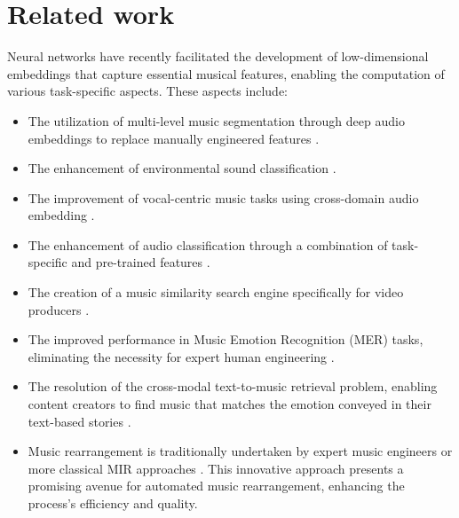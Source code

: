 \section{Related work}

Neural networks have recently facilitated the development of low-dimensional embeddings that capture essential musical features, enabling the computation of various task-specific aspects. These aspects include:

\begin{itemize}

\item The utilization of multi-level music segmentation through deep audio embeddings to replace manually engineered features \cite{SalamonDeepSegmentation}.

\item The enhancement of environmental sound classification \cite{Kim2020OneStrategies}.

\item The improvement of vocal-centric music tasks using cross-domain audio embedding \cite{Kim2021LearningLoss}.

\item The enhancement of audio classification through a combination of task-specific and pre-trained features \cite{Hung2022Feature-informedClassification}.

\item The creation of a music similarity search engine specifically for video producers \cite{epidemic}.

\item The improved performance in Music Emotion Recognition (MER) tasks, eliminating the necessity for expert human engineering \cite{KohComparisonRecognition}.

\item The resolution of the cross-modal text-to-music retrieval problem, enabling content creators to find music that matches the emotion conveyed in their text-based stories \cite{WonEmotionStories}.

\item Music rearrangement is traditionally undertaken by expert music engineers or more classical MIR approaches \cite{Stoller2018IntuitiveTransitions}. This innovative approach presents a promising avenue for automated music rearrangement, enhancing the process's efficiency and quality. \cite{Plachouras2023MusicSegmentation}

\end{itemize}

